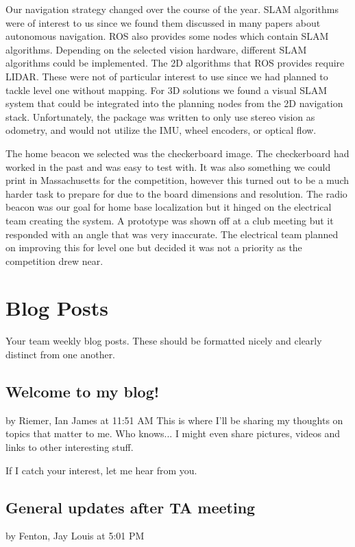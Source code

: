 \documentclass[10pt, oneside,onecolumn]{IEEEtran}
\begin{document}
\begin{titlepage}
Our navigation strategy changed over the course of the year. SLAM algorithms were of interest to us since we found them discussed in many papers about autonomous navigation. ROS also provides some nodes which contain SLAM algorithms. Depending on the selected vision hardware, different SLAM algorithms could be implemented. The 2D algorithms that ROS provides require LIDAR. These were not of particular interest to use since we had planned to tackle level one without mapping. For 3D solutions we found a visual SLAM system that could be integrated into the planning nodes from the 2D navigation stack. Unfortunately, the package was written to only use stereo vision as odometry, and would not utilize the IMU, wheel encoders, or optical flow. 

The home beacon we selected was the checkerboard image. The checkerboard had worked in the past and was easy to test with. It was also something we could print in Massachusetts for the competition, however this turned out to be a much harder task to prepare for due to the board dimensions and resolution. The radio beacon was our goal for home base localization but it hinged on the electrical team creating the system. A prototype was shown off at a club meeting but it responded with an angle that was very inaccurate. The electrical team planned on improving this for level one but decided it was not a priority as the competition drew near. 

\section{Blog Posts}

Your team weekly blog posts. These should be formatted nicely and clearly distinct from one another.

\subsection{Welcome to my blog!}
by Riemer, Ian James at 11:51 AM
This is where I'll be sharing my thoughts on topics that matter to me. Who knows... I might even share pictures, videos and links to other interesting stuff.

If I catch your interest, let me hear from you.


\subsection{General updates after TA meeting}
by Fenton, Jay Louis at 5:01 PM


\end{titlepage}
\end{document}
